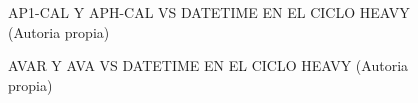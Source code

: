 \begin{figure}[H]
  \hfill
  \hfill
  \hfill
  \caption{AP1-CAL Y APH-CAL VS DATETIME EN EL CICLO HEAVY (Autoria propia)}
  \end{figure}
\begin{figure}[H]
  \hfill
  \hfill
  \hfill
  \caption{AVAR Y AVA VS DATETIME EN EL CICLO HEAVY (Autoria propia)}
  \end{figure}
